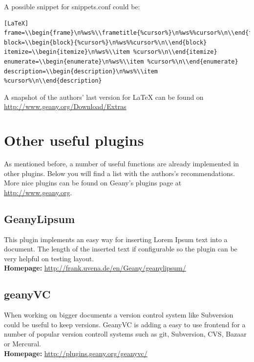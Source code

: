 \documentclass[%
paper=a4,%
fontsize=11pt,%
twoside=false,%
DIV18,%
headsepline,%
plainheadsepline,%
footsepline,%
plainfootsepline,%
bibliography=totoc,%
listof=totoc,%
BCOR10mm,%
parskip=half,%
openany,%
]{scrreprt}
\begin{document}
A possible snippet for snippets.conf could be:

\begin{lstlisting}[caption={Minimal snippets.conf for \LaTeX{}}]
[LaTeX]
frame=\\begin{frame}\n%ws%\\frametitle{%cursor%}\n%ws%%cursor%\n\\end{frame}
block=\\begin{block}{%cursor%}\n%ws%%cursor%\n\\end{block}
itemize=\\begin{itemize}\n%ws%\\item %cursor%\n\\end{itemize}
enumerate=\\begin{enumerate}\n%ws%\\item %cursor%\n\\end{enumerate}
description=\\begin{description}\n%ws%\\item %cursor%\n\\end{description}
\end{lstlisting}

A snapshot of the authors' last version for LaTeX can be found on
\url{http://www.geany.org/Download/Extras}

\section{Other useful plugins}
As mentioned before, a number of useful functions are already
implemented in other plugins. Below you will find a list with the
authors's recommendations. More nice plugins can be found on Geany's
plugins page at \url{http://www.geany.org}.

\subsection{GeanyLipsum}
This plugin implements an easy way for inserting Lorem Ipsum text into
a document. The length of the inserted text if configurable so the
plugin can be very helpful on testing layout.\\
\textbf{Homepage:} \url{http://frank.uvena.de/en/Geany/geanylipsum/}

\subsection{geanyVC}
When working on bigger documents a version control system like
Subversion could be useful to keep versions. GeanyVC is adding a easy
to use frontend for a number of popular version controll systems such
as git, Subversion, CVS, Bazaar or Mercural.\\
\textbf{Homepage:} \url{http://plugins.geany.org/geanyvc/}
\end{document}

